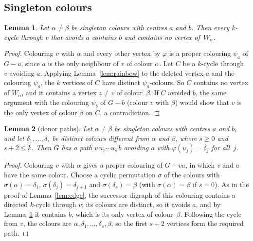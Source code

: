 \documentclass[11pt]{article}
\newtheorem{lemma}{Lemma}
\theoremstyle{remark}
\begin{document}
\subsection{Singleton colours}

\begin{lemma}\label{lem:retain}
Let $\alpha\ne\beta$ be singleton colours with centres $a$ and $b$. Then every
$k$-cycle through $v$ that avoids $a$ contains $b$ and contains no vertex
of~$W_\alpha$.
\end{lemma}

\begin{proof}
Colouring $v$ with $\alpha$ and every other vertex by $\varphi$ is a proper
colouring $\psi_a$ of $G-a$, since $a$ is the only neighbour of $v$ of colour
$\alpha$. Let $C$ be a $k$-cycle through $v$ avoiding $a$. Applying
Lemma~\ref{lem:rainbow} to the deleted vertex $a$ and the colouring $\psi_a$,
the $k$ vertices of $C$ have distinct $\psi_a$-colours. So $C$ contains no vertex
of $W_\alpha$, and it contains a vertex $z\ne v$ of colour~$\beta$. If $C$
avoided $b$, the same argument with the colouring $\psi_b$ of $G-b$ (colour $v$
with $\beta$) would show that $v$ is the only vertex of colour $\beta$ on $C$,
a contradiction.
\end{proof}

\begin{lemma}[donor paths]\label{lem:donor}
Let $\alpha\ne\beta$ be singleton colours with centres $a$ and $b$, and let
$\delta_1,\dots,\delta_s$ be distinct colours different from $\alpha$ and
$\beta$, where $s\ge0$ and $s+2\le k$. Then $G$ has a path
$v\,u_1\cdots u_s\,b$ avoiding $a$ with $\varphi(u_j)=\delta_j$ for all~$j$.
\end{lemma}

\begin{proof}
Colouring $v$ with $\alpha$ gives a proper colouring of $G-va$, in which $v$ and
$a$ have the same colour. Choose a cyclic permutation $\sigma$ of the colours
with $\sigma(\alpha)=\delta_1$, $\sigma(\delta_j)=\delta_{j+1}$ and
$\sigma(\delta_s)=\beta$ (with $\sigma(\alpha)=\beta$ if $s=0$). As in the
proof of Lemma~\ref{lem:edge}, the successor digraph of this colouring contains
a directed $k$-cycle through $v$; its colours are distinct, so it avoids $a$,
and by Lemma~\ref{lem:retain} it contains $b$, which is its only vertex of
colour~$\beta$. Following the cycle from $v$, the colours are
$\alpha,\delta_1,\dots,\delta_s,\beta$, so the first $s+2$ vertices form the
required path.
\end{proof}
\end{document}
